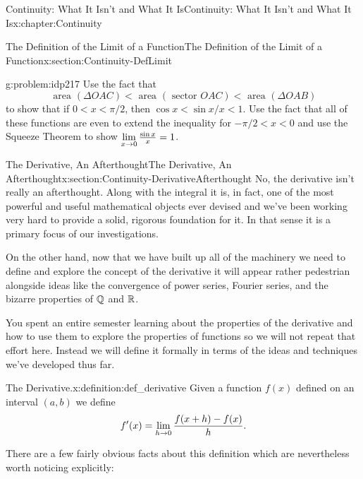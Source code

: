 \begin{chapterptx}{Continuity: What It Isn't and What It Is}{}{Continuity: What It Isn't and What It Is}{}{}{x:chapter:Continuity}
\begin{sectionptx}{The Definition of the Limit of a Function}{}{The Definition of the Limit of a Function}{}{}{x:section:Continuity-DefLimit}
\begin{image}{0.2}{0.6}{0.2}
		\end{image}%
		\begin{problem}{}{g:problem:idp217}%
			Use the fact that%
			\begin{equation*}
				\text{ area } (\Delta OAC)\lt \text{ area } (\text{ sector } OAC)\lt \text{ area } (\Delta OAB)
			\end{equation*}
			to show that if \(0\lt x\lt \pi/2\), then \(\cos x\lt
			\sin x/x\lt 1\).  Use the fact that all of these functions are even to extend the inequality for \(-\pi/2\lt x\lt
			0\) and use the Squeeze Theorem to show \({\displaystyle\lim_{x\rightarrow 0}\textstyle\frac{\sin x}{x}}=1\).%
		\end{problem}
	\end{sectionptx}
	\typeout{************************************************}
	\typeout{************************************************}
	\begin{sectionptx}{The Derivative, An Afterthought}{}{The Derivative, An Afterthought}{}{}{x:section:Continuity-DerivativeAfterthought}
		No, the derivative isn't really an afterthought.  Along with the integral it is, in fact, one of the most powerful and useful mathematical objects ever devised and we've been working very hard to provide a solid, rigorous foundation for it.  In that sense it is a primary focus of our investigations.%
		\par
		On the other hand, now that we have built up all of the machinery we need to define and explore the concept of the derivative it will appear rather pedestrian alongside ideas like the convergence of power series, Fourier series, and the bizarre properties of \(\mathbb {Q}\) and \(\mathbb {R}\).%
		\par
		You spent an entire semester learning about the properties of the derivative and how to use them to explore the properties of functions so we will not repeat that effort here.  Instead we will define it formally in terms of the ideas and techniques we've developed thus far.%
		\begin{definition}{The Derivative.}{x:definition:def_derivative}%
			Given a function \(f(x)\) defined on an interval \((a,b)\) we define%
			\begin{equation*}
				f^\prime(x) = {\displaystyle\lim_{h\rightarrow 0}\frac{f(x+h)-f(x)}{h}}.{}
			\end{equation*}
		\end{definition}
		There are a few fairly obvious facts about this definition which are nevertheless worth noticing explicitly:%

\end{sectionptx}
\end{chapterptx}
